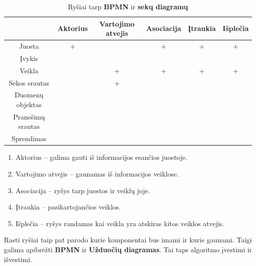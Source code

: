 \documentclass{VUMIFInfBakalaurinis}
\begin{document}
\begin{center}
    \begin{longtable}{ | c | c |  c | c | c | c |}
    \caption{Ryšiai tarp \textbf{BPMN} ir \textbf{sekų diagramų}}
	\label{tab:relations_sd_bpmn}
    \\ \hline 
     & 
     Aktorius 
     & 
     Vartojimo atvejis 
     & 
     Asociacija 
     & 
     Įtraukia 
     & 
     Išplečia 
     \\ 
    \hline 
    Juosta & + & & + & + & + \\
    \hline
    Įvykis  & & & & & \\
    \hline 
    Veikla  & & + & + & + & + \\
    \hline 
    Sekos srautas  & & + & & & \\
    \hline
    Duomenų objektas  & & & & & \\
    \hline
    Pranešimų srautas  & & & & & \\
    \hline
    Sprendimas  & & & & & \\
    \hline
    \end{longtable}
\end{center} 

\begin{enumerate}
	\item Aktorius – galima gauti iš informacijos esančios juostoje. 
	\item Vartojimo atvejis – gaunamas iš informacijos veiklose.
	\item Asociacija – ryšys tarp juostos ir veiklų joje.
	\item Įtraukia – pasikartojančios veiklos.
	\item Išplečia – ryšys randamas kai veikla yra atskiras kitos veiklos atvejis.
\end{enumerate} 

Rasti ryšiai taip pat parodo kurie komponentai bus imami ir kurie gaunami. Taigi galima apibrėžti \textbf{BPMN} ir \textbf{Užduočių diagramas}. Tai taps algoritmo įvestimi ir išvestimi.
\end{document}
